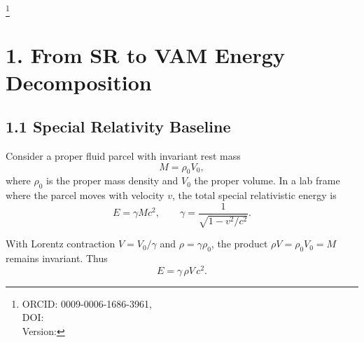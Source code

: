 \documentclass[reprint,aps,onecolumn,nofootinbib]{revtex4-2}
\newcommand{\swirlarrow}{%
    \mathchoice{\mkern-2mu\scriptstyle\boldsymbol{\circlearrowleft}}%
    {\mkern-2mu\scriptstyle\boldsymbol{\circlearrowleft}}%
    {\mkern-2mu\scriptscriptstyle\boldsymbol{\circlearrowleft}}%
    {\mkern-2mu\scriptscriptstyle\boldsymbol{\circlearrowleft}}%
}
\newcommand{\vswirl}{\mathbf{v}_{\swirlarrow}}
\newcommand{\Ce}{\vswirl}
\begin{document}
\title{\papertitle }
\author{Omar Iskandarani}
\thanks{ORCID: 0009-0006-1686-3961,\\
DOI: \paperdoi \\
Version: \paperversion
}
\date{\today}

\begin{abstract}
This paper examines the energetics of transient luminous events (sprites and giant jets) through a systematic mapping from special relativity (SR) to the Vortex \AE ther Model (VAM) and then to the canonical Swirl--String Theory (SST). We show that the SR rest--kinetic decomposition re-emerges in VAM with $c \mapsto \Ce$, and that the same structure has a natural translation into SST via the Swirl Clock formalism. The goal is to provide a coherent physical and mathematical account of excitation (giant jets) and relaxation (sprites) as macroscopic analogues of quantum transitions.
\end{abstract}
\maketitle
\section*{1. From SR to VAM Energy Decomposition}

    \subsection*{1.1 Special Relativity Baseline}

        Consider a proper fluid parcel with invariant rest mass
        \[
            M = \rho_0 V_0 ,
        \]
        where $\rho_0$ is the proper mass density and $V_0$ the proper volume.
        In a lab frame where the parcel moves with velocity $v$, the total
        special relativistic energy is
        \begin{equation}
        E = \gamma M c^2,
        \qquad
        \gamma = \frac{1}{\sqrt{1 - v^2/c^2}}.
        \label{eq:SRtotal}
        \end{equation}

        With Lorentz contraction $V = V_0/\gamma$ and $\rho = \gamma \rho_0$,
        the product $\rho V = \rho_0 V_0 = M$ remains invariant. Thus
        \begin{equation}
        E = \gamma\, \rho V\, c^2.
        \label{eq:SRrho}
        \end{equation}
\end{document}
